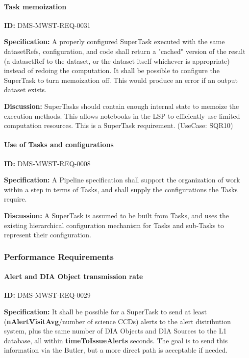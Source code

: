 \documentclass[SE,toc,lsstdraft]{lsstdoc}
\begin{document}
\paragraph{Task memoization}\hfill  %

\label{DMS-MWST-REQ-0031}
\textbf{ID:} DMS-MWST-REQ-0031

\textbf{Specification:}
A properly configured SuperTask executed with the same datasetRefs, configuration, and code shall return a "cached" version of the result (a datasetRef to the dataset, or the dataset itself whichever is appropriate) instead of redoing the computation. It shall be possible to configure the SuperTask to turn memoization off. This would produce an error if an output dataset exists.

\textbf{Discussion:}
SuperTasks should contain enough internal state to memoize the execution methods. This allows notebooks in the LSP to efficiently use limited computation resources. This is a SuperTask requirement. (UseCase: SQR10)

\paragraph{Use of Tasks and configurations}\hfill  %

\label{DMS-MWST-REQ-0008}
\textbf{ID:} DMS-MWST-REQ-0008

\textbf{Specification:}
A Pipeline specification shall support the organization of work within a step in terms of Tasks, and shall supply the configurations the Tasks require.

\textbf{Discussion:}
A SuperTask is assumed to be built from Tasks, and uses the existing hierarchical configuration mechanism for Tasks and sub-Tasks to represent their configuration.

\subsubsection{Performance Requirements}

\paragraph{Alert and DIA Object transmission rate}\hfill  %

\label{DMS-MWST-REQ-0029}
\textbf{ID:} DMS-MWST-REQ-0029

\textbf{Specification:}
It shall be possible for a SuperTask to send at least (\textbf{nAlertVisitAvg}/number of science CCDs) alerts to the alert distribution system, plus the same number of DIA Objects and DIA Sources to the L1 database, all within \textbf{timeToIssueAlerts} seconds. The goal is to send this information via the Butler, but a more direct path is acceptable if needed.
\end{document}
